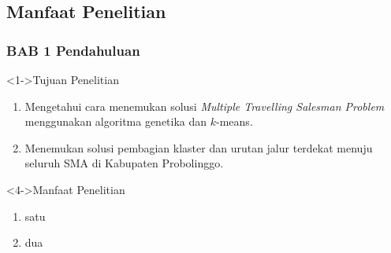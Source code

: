 \subsection{Manfaat Penelitian}

\begin{frame}
\frametitle{BAB 1 Pendahuluan}
\begin{block}<1->{Tujuan Penelitian}
\begin{enumerate}
\item<2-> Mengetahui cara menemukan solusi \textit{Multiple Travelling Salesman Problem} menggunakan algoritma genetika dan $k$-means.
\item<3-> Menemukan solusi pembagian klaster dan urutan jalur terdekat menuju seluruh SMA di Kabupaten Probolinggo.
\end{enumerate}
\end{block}

\begin{block}<4->{Manfaat Penelitian}
\begin{enumerate}
\item<5-> satu
\item<6-> dua
\end{enumerate}
\end{block}
\end{frame}